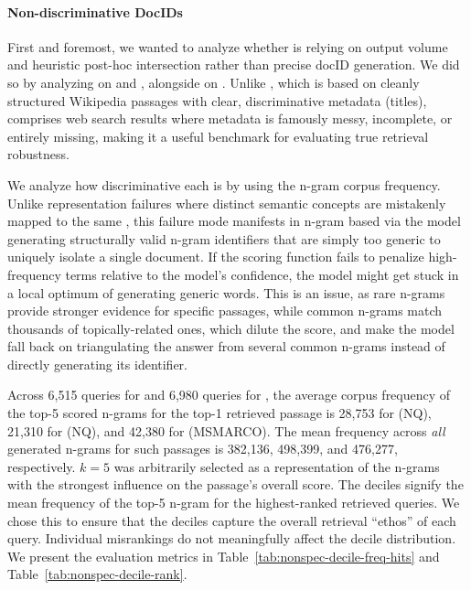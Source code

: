 \paragraph{Non-discriminative DocIDs}
\label{sec:failure-low-lex-spec}

First and foremost, we wanted to analyze whether  is relying on output volume and heuristic post-hoc intersection rather than precise docID generation. We did so by analyzing  on  and , alongside  on . Unlike , which is based on cleanly structured Wikipedia passages with clear, discriminative metadata (titles),  comprises web search results where metadata is famously messy, incomplete, or entirely missing, making it a useful benchmark for evaluating true retrieval robustness.

We analyze how discriminative each  is by using the n-gram corpus frequency. Unlike representation failures where distinct semantic concepts are mistakenly mapped to the same , this failure mode manifests in n-gram based  via the model generating structurally valid n-gram identifiers that are simply too generic to uniquely isolate a single document. If the scoring function fails to penalize high-frequency terms relative to the model's confidence, the model might get stuck in a local optimum of generating generic words. This is an issue, as rare n-grams provide stronger evidence for specific passages, while common n-grams match thousands of topically-related ones, which dilute the score, and make the model fall back on triangulating the answer from several common n-grams instead of directly generating its identifier.

Across 6,515 queries for  and 6,980 queries for , the average corpus frequency of the top-5 scored n-grams for the top-1 retrieved passage is 28,753 for  (NQ), 21,310 for  (NQ), and 42,380 for  (MSMARCO). The mean frequency across \textit{all} generated n-grams for such passages is 382,136, 498,399, and 476,277, respectively. $k=5$ was arbitrarily selected as a representation of the n-grams with the strongest influence on the passage's overall score. The deciles signify the mean frequency of the top-5 n-gram for the highest-ranked retrieved queries. We chose this to ensure that the deciles capture the overall retrieval ``ethos'' of each query. Individual misrankings do not meaningfully affect the decile distribution. We present the evaluation metrics in Table~\ref{tab:nonspec-decile-freq-hits} and Table~\ref{tab:nonspec-decile-rank}.


